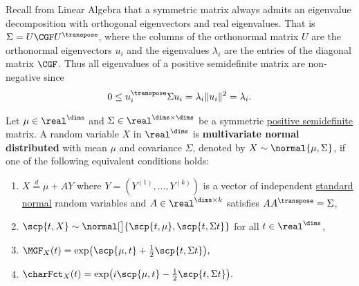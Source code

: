 \begin{remark}
    Recall from Linear Algebra that a symmetric matrix always admits an
    eigenvalue decomposition with orthogonal eigenvectors and real eigenvalues.
    That is \(\Sigma = U \CGF U^\transpose\), where the columns of
    the orthonormal matrix \(U\) are the orthonormal eigenvectors \(u_i\) and
    the eigenvalues \(\lambda_i\) are the entries of the diagonal matrix
    \(\CGF\). Thus all eigenvalues of a positive semidefinite matrix
    are non-negative since
    \[
        0\le u_i^\transpose \Sigma u_i = \lambda_i \|u_i\|^2 = \lambda_i.
    \]
\end{remark}

\begin{definition}
    \label{def: multivariate normal distribution}
    Let \(\mu\in \real^\dims\) and \(\Sigma \in \real^{\dims \times \dims}\)
    be a symmetric \underline{positive semidefinite} matrix.
    A random variable \(X\) in \(\real^\dims\) is \textbf{multivariate normal
    distributed} with mean \(\mu\) and covariance \(\Sigma\), denoted by \(X
    \sim \normal{\mu, \Sigma}\), if one of the following equivalent conditions
    holds:
    \begin{enumerate}[label=(\roman*), noitemsep]
        \item\label{it: multivariate standard normal} \(X \overset{d}= \mu + A
        Y\) where \(Y=(Y^{(1)}, \ldots, Y^{(k)})\) is a vector of
        independent \underline{standard normal} random variables and
        \(A\in \real^{\dims\times k}\) satisfies \(A A^\transpose = \Sigma\),

        \item\label{it: multivariate linear normal}
        \(\scp{t, X} \sim \normal[\big]{\scp{t, \mu}, \scp{t, \Sigma t}}\)
        for all \(t\in \real^\dims\),

        \item\label{it: multivariate mgf normal}
        \(
            \MGF_X(t)
            = \exp\bigl(\scp{\mu, t} + \tfrac12 \scp{t, \Sigma t}\bigr),
        \)

        \item\label{it: multivariate char fct normal}
        \(
            \charFct_X(t)
            = \exp\bigl(i \scp{\mu, t} - \tfrac12 \scp{t, \Sigma t}\bigr).
        \)
    \end{enumerate}
\end{definition}

